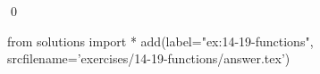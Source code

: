 
\begin{ex}
  \label{ex:14-19-functions}
  
  \qed
\end{ex}
\begin{python0}
from solutions import *
add(label="ex:14-19-functions",
    srcfilename='exercises/14-19-functions/answer.tex')
\end{python0}
